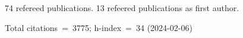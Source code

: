 74 refereed publications. 13 refeered publications as first author.

Total citations~=~3775; h-index~=~34 (2024-02-06)